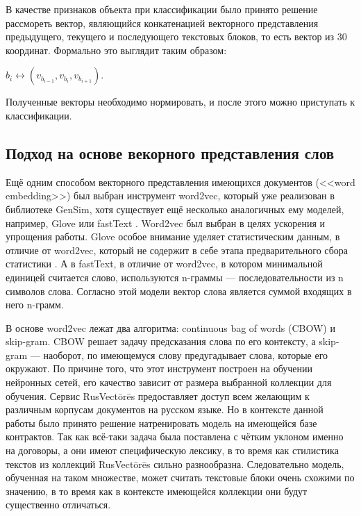 \documentclass[12pt]{article}
\begin{document}
В качестве признаков объекта при классификации было принято решение рассмореть вектор, являющийся конкатенацией векторного представления предыдущего, текущего и последующего текстовых блоков, то есть вектор из 30 координат. Формально это выглядит таким образом:

\begin{center}
	$b_i \leftrightarrow (v_{b_{i-1}}, v_{b_i}, v_{b_{i+1}})$.
\end{center}

Полученные векторы необходимо нормировать, и после этого можно приступать к классификации.

\subsection{Подход на основе векорного представления слов}

Ещё одним способом векторного представления имеющихся документов (<<word embedding>>) был выбран инструмент word2vec, который уже реализован в библиотеке GenSim, хотя существует ещё несколько аналогичных ему моделей, например, Glove \cite{glove} или fastText \cite{fasttext}. Word2vec был выбран в целях ускорения и упрощения работы. Glove особое внимание уделяет статистическим данным, в отличие от word2vec, который не содержит в себе этапа предварительного сбора статистики \cite{zakirov, predict}. А в fastText, в отличие от word2vec, в котором минимальной единицей считается слово, используются n-граммы — последовательности из n символов слова. Согласно этой модели вектор слова является суммой входящих в него n-грамм.

В основе word2vec лежат два алгоритма: continuous bag of words (CBOW) и skip-gram. CBOW решает задачу предсказания слова по \linebreak его контексту, а skip-gram --- наоборот, по имеющемуся слову предугадывает слова, которые его окружают. По причине того, что этот \linebreak инструмент построен на обучении нейронных сетей, его качество \linebreak зависит от размера выбранной коллекции для обучения. Сервис \linebreak RusVectōrēs предоставляет доступ всем желающим к различным корпусам документов на русском языке. Но в контексте данной работы было принято решение натренировать модель на имеющейся базе контрактов. Так как всё-таки задача была поставлена с чётким уклоном именно на договоры, а они имеют специфическую лексику, в то время как стилистика текстов из коллекций RusVectōrēs сильно разнообразна. Следовательно модель, обученная на таком множестве, может считать текстовые блоки очень схожими по значению, в то время как в контексте имеющейся коллекции они будут существенно отличаться.  
\end{document}
